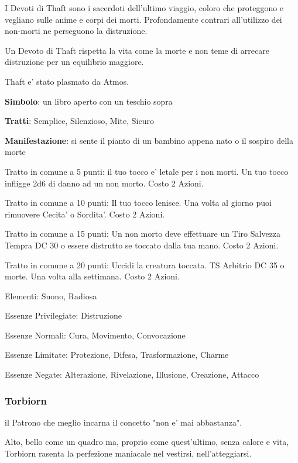 \documentclass[a4paper,11pt,twoside,openany]{book}
\begin{document}
{I Devoti di Thaft sono i sacerdoti dell'ultimo viaggio, coloro che proteggono e vegliano sulle anime e corpi dei morti. Profondamente contrari all'utilizzo dei non-morti ne perseguono la distruzione.

Un Devoto di Thaft rispetta la vita come la morte e non teme di arrecare distruzione per un equilibrio maggiore.

Thaft e' stato plasmato da Atmos.

\textbf{Simbolo}: un libro aperto con un teschio sopra

\textbf{Tratti}: Semplice, Silenzioso, Mite, Sicuro

\textbf{Manifestazione}: si sente il pianto di un bambino appena nato o il sospiro della morte

\bigskip

Tratto in comune a 5 punti: il tuo tocco e' letale per i non morti. Un tuo tocco infligge 2d6 di danno ad un non morto. Costo 2 Azioni.

Tratto in comune a 10 punti: Il tuo tocco lenisce. Una volta al giorno puoi rimuovere Cecita' o Sordita'. Costo 2 Azioni.

Tratto in comune a 15 punti: Un non morto deve effettuare un Tiro Salvezza Tempra DC 30 o essere distrutto se toccato dalla tua mano. Costo 2 Azioni.

Tratto in comune a 20 punti: Uccidi la creatura toccata. TS Arbitrio DC 35 o morte. Una volta alla settimana. Costo 2 Azioni.

\bigskip

Elementi: Suono, Radiosa

\bigskip

Essenze Privilegiate: Distruzione

Essenze Normali: Cura, Movimento, Convocazione

Essenze Limitate: Protezione, Difesa, Trasformazione, Charme

Essenze Negate: Alterazione, Rivelazione, Illusione, Creazione, Attacco

\subsubsection{Torbiorn}

\label{torbiorn}

il Patrono che meglio incarna il concetto "non e' mai abbastanza".

Alto, bello come un quadro ma, proprio come quest'ultimo, senza calore e vita, Torbiorn rasenta la perfezione maniacale nel vestirsi, nell'atteggiarsi.

}
\end{document}
